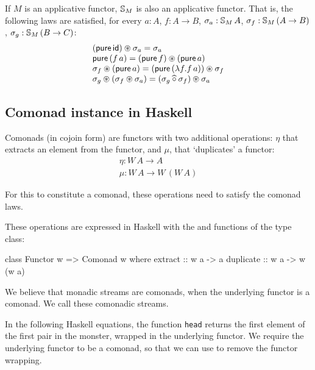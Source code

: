 \begin{conjecture}\label{lemma:appl_laws}
If $M$ is an applicative functor, $\mathbb{S}_{M}$ is also an applicative functor.
That is, the following laws are satisfied, for every $a:A$, $f:A\rightarrow B$, $\sigma_a:\mathbb{S}_{M}\,A$, $\sigma_f : \mathbb{S}_{M}\,(A\rightarrow B)$, $\sigma_g: \mathbb{S}_{M}\,(B\rightarrow C)$:
$$
\begin{array}{l}
(\mathsf{pure}\,\mathsf{id}) \circledast \sigma_a = \sigma_a \\
\mathsf{pure}\,(f\,a) = (\mathsf{pure}\,f) \circledast (\mathsf{pure}\,a) \\
\sigma_f \circledast (\mathsf{pure}\,a) = (\mathsf{pure}\,(\lambda f. f\,a)) \circledast \sigma_f \\
\sigma_g \circledast (\sigma_f \circledast \sigma_a) = (\sigma_g \mathbin{\widehat{\circ}} \sigma_f) \circledast \sigma_a
\end{array}
$$
\end{conjecture}

\subsection{Comonad instance in Haskell}

Comonads (in cojoin form) are functors with two additional operations: $\eta$ that extracts an element from the functor, and $\mu$, that `duplicates' a functor:
$$
\begin{array}{l}
\eta : W\,A \to A\\
\mu : W\,A \to W\,(W\,A)
\end{array}
$$

For this to constitute a comonad, these operations need to satisfy the comonad laws.

These operations are expressed in Haskell with the  and  functions of the  type class:

\begin{haskell}
class Functor w => Comonad w where
  extract :: w a -> a
  duplicate :: w a -> w (w a)
\end{haskell}

We believe that monadic streams are comonads, when the underlying functor is a comonad. We call these comonadic streams.

In the following Haskell equations, the function \verb+head+ returns the first element of the first pair in the monster, wrapped in the underlying functor. We require the underlying functor to be a comonad, so that we can use  to remove the functor wrapping.

